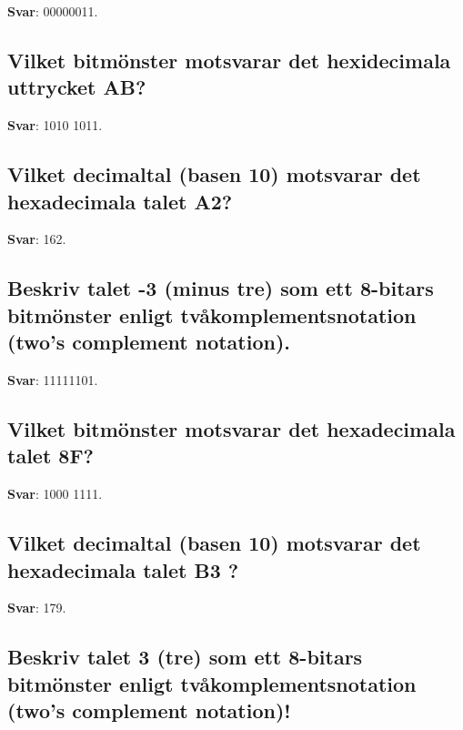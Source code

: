 \documentclass[a4paper,11pt,oneside]{article}
\begin{document}
\begin{sloppypar}
\label{q:360:sa:sv:True}

\textbf{Svar}: 00000011.



\subsection{Vilket bitm\"onster motsvarar det hexidecimala uttrycket AB?}

\label{q:361:sa:sv:True}

\textbf{Svar}: 1010 1011.



\subsection{Vilket decimaltal (basen 10) motsvarar det hexadecimala talet A2?}

\label{q:362:sa:sv:True}

\textbf{Svar}: 162.



\subsection{Beskriv talet -3 (minus tre) som ett 8-bitars bitm\"onster enligt tv\r{a}komplementsnotation (two{\textquoteright}s complement notation).}

\label{q:363:sa:sv:True}

\textbf{Svar}: 11111101.



\subsection{Vilket bitm\"onster motsvarar det hexadecimala talet 8F?}

\label{q:364:sa:sv:True}

\textbf{Svar}: 1000 1111.



\subsection{Vilket decimaltal (basen 10) motsvarar det hexadecimala talet B3 ?}

\label{q:365:sa:sv:True}

\textbf{Svar}: 179.



\subsection{Beskriv talet 3 (tre) som ett 8-bitars bitm\"onster enligt tv\r{a}komplementsnotation (two{\textquoteright}s complement notation)!}


\end{sloppypar}
\end{document}
